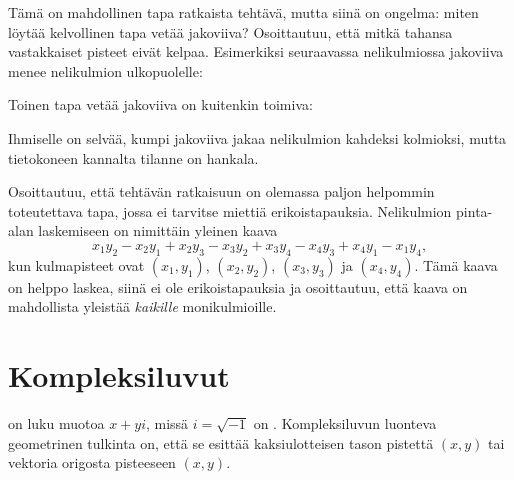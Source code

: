 Tämä on mahdollinen tapa ratkaista tehtävä,
mutta siinä on ongelma:
miten löytää kelvollinen tapa vetää jakoviiva?
Osoittautuu, että
mitkä tahansa vastakkaiset pisteet eivät kelpaa.
Esimerkiksi seuraavassa nelikulmiossa
jakoviiva menee nelikulmion ulkopuolelle:
\begin{center}
\end{center}
Toinen tapa vetää jakoviiva on kuitenkin toimiva:
\begin{center}
\end{center}
Ihmiselle on selvää, kumpi jakoviiva jakaa nelikulmion
kahdeksi kolmioksi, mutta tietokoneen kannalta
tilanne on hankala.

Osoittautuu, että tehtävän ratkaisuun on olemassa
paljon helpommin toteutettava tapa,
jossa ei tarvitse miettiä erikoistapauksia.
Nelikulmion pinta-alan laskemiseen
on nimittäin yleinen kaava
\[x_1y_2-x_2y_1+x_2y_3-x_3y_2+x_3y_4-x_4y_3+x_4y_1-x_1y_4,\]
kun kulmapisteet ovat
$(x_1,y_1)$,
$(x_2,y_2)$,
$(x_3,y_3)$ ja
$(x_4,y_4)$.
Tämä kaava on helppo laskea, siinä ei ole erikoistapauksia
ja osoittautuu, että kaava on mahdollista yleistää
\textit{kaikille} monikulmioille.

\section{Kompleksiluvut}


 on luku muotoa $x+y i$, missä $i = \sqrt{-1}$
on .
Kompleksiluvun luonteva geometrinen tulkinta on,
että se esittää kaksiulotteisen tason pistettä $(x,y)$
tai vektoria origosta pisteeseen $(x,y)$.


